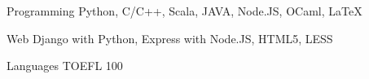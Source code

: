 

\begin{cvskills}

  \cvskill
    {Programming} %
    {Python, C/C++, Scala, JAVA, Node.JS, OCaml, LaTeX} %

  \cvskill
    {Web} %
    {Django with Python, Express with Node.JS, HTML5, LESS} %

  \cvskill
    {Languages} %
    {TOEFL 100} %

\end{cvskills}
